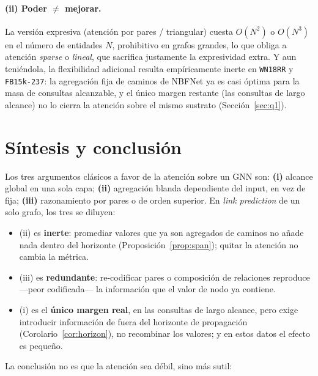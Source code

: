\documentclass[11pt]{article}
\theoremstyle{plain}
\theoremstyle{definition}
\begin{document}
\paragraph{(ii) Poder $\neq$ mejorar.} La versión expresiva (atención por pares / triangular) cuesta
$O(N^2)$ o $O(N^3)$ en el número de entidades $N$, prohibitivo en grafos grandes, lo que obliga a
atención \emph{sparse} o \emph{lineal}, que sacrifica justamente la expresividad extra. Y aun
teniéndola, la flexibilidad adicional resulta empíricamente inerte en \texttt{WN18RR} y
\texttt{FB15k-237}: la agregación fija de caminos de NBFNet ya es casi óptima para la masa de consultas
alcanzable, y el único margen restante (las consultas de largo alcance) no lo cierra la atención sobre
el mismo sustrato (Sección~\ref{sec:q1}).

\section{Síntesis y conclusión}

Los tres argumentos clásicos a favor de la atención sobre un GNN son: \textbf{(i)} alcance global en
una sola capa; \textbf{(ii)} agregación blanda dependiente del input, en vez de fija; \textbf{(iii)}
razonamiento por pares o de orden superior. En \emph{link prediction} de un solo grafo, los tres se
diluyen:
\begin{itemize}[leftmargin=1.4em]
  \item (ii) es \textbf{inerte}: promediar valores que ya son agregados de caminos no añade nada dentro
        del horizonte (Proposición~\ref{prop:span}); quitar la atención no cambia la métrica.
  \item (iii) es \textbf{redundante}: re-codificar pares o composición de relaciones reproduce ---peor
        codificada--- la información que el valor de nodo ya contiene.
  \item (i) es el \textbf{único margen real}, en las consultas de largo alcance, pero exige introducir
        información de fuera del horizonte de propagación (Corolario~\ref{cor:horizon}), no recombinar
        los valores; y en estos datos el efecto es pequeño.
\end{itemize}

\noindent
La conclusión no es que la atención sea débil, sino más sutil:

\begin{center}
\end{center}
\end{document}
